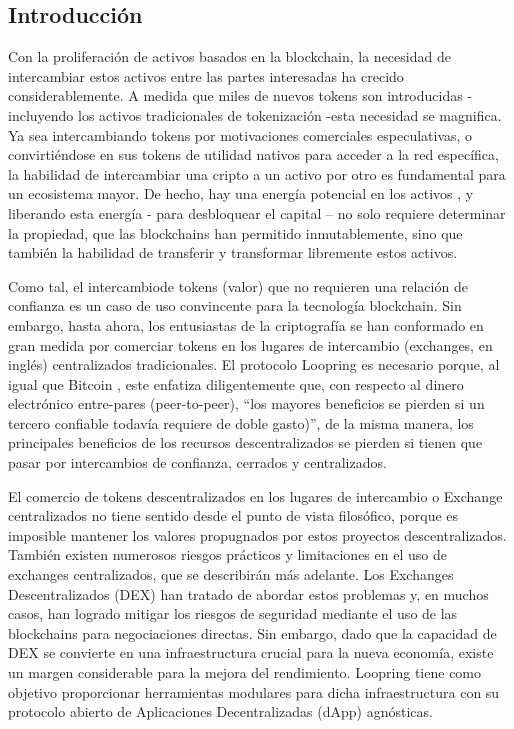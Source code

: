 \documentclass[UTF8,nofonts]{article}
\begin{document}
\begin{multicols}{2}
\section{Introducci\'on\label{sec:introduction}}
Con la proliferaci\'on de activos basados en la blockchain, la necesidad de intercambiar estos activos entre las partes interesadas ha crecido considerablemente.  A medida que miles de nuevos tokens son introducidas - incluyendo los activos tradicionales de tokenizaci\'on -esta necesidad se magnifica. Ya sea intercambiando tokens por motivaciones comerciales especulativas, o convirti\'endose en sus tokens de utilidad nativos para acceder a la red espec\'ifica, la habilidad de intercambiar una cripto a un activo por otro es fundamental para un ecosistema mayor. De hecho, hay una energ\'ia potencial en los activos \cite{desotocapital}, y liberando esta energ\'ia - para desbloquear el capital – no solo requiere determinar la propiedad, que las blockchains han permitido inmutablemente, sino que tambi\'en la habilidad de transferir y transformar libremente estos activos.

Como tal, el intercambiode tokens (valor) que no requieren una relaci\'on de confianza es un caso de uso convincente para la tecnolog\'ia blockchain. Sin embargo, hasta ahora, los entusiastas de la criptograf\'ia se han conformado en gran medida por comerciar tokens en los lugares de intercambio (exchanges, en ingl\'es) centralizados tradicionales.  El protocolo Loopring es necesario porque, al igual que Bitcoin \cite{nakamoto2008bitcoin}, este enfatiza diligentemente que, con respecto al dinero electr\'onico entre-pares (peer-to-peer), \enquote{los mayores beneficios se pierden si un tercero confiable todav\'ia requiere de doble gasto)}, de la misma manera, los principales beneficios de los recursos descentralizados se pierden si tienen que pasar por intercambios de confianza, cerrados y centralizados.

El comercio de tokens descentralizados en los lugares de intercambio o Exchange centralizados no tiene sentido desde el punto de vista filos\'ofico, porque es imposible mantener los valores propugnados por estos proyectos descentralizados. Tambi\'en existen numerosos riesgos pr\'acticos y limitaciones en el uso de exchanges centralizados, que se describir\'an m\'as adelante. Los Exchanges Descentralizados (DEX) \cite{schuh2015bitshares} \cite{bancor} \cite{kyber} han tratado de abordar estos problemas y, en muchos casos, han logrado mitigar los riesgos de seguridad mediante el uso de las blockchains para negociaciones directas. Sin embargo, dado que la capacidad de DEX se convierte en una infraestructura crucial para la nueva econom\'ia, existe un margen considerable para la mejora del rendimiento. Loopring tiene como objetivo proporcionar herramientas modulares para dicha infraestructura con su protocolo abierto de Aplicaciones Decentralizadas (dApp) agn\'osticas.



\end{multicols}
\end{document}
